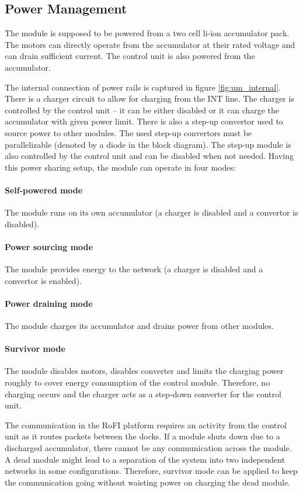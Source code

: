 \subsection{Power Management}

The module is supposed to be powered from a two cell li-ion accumulator pack.
The motors can directly operate from the accumulator at their rated voltage and
can drain sufficient current. The control unit is also powered from the
accumulator.

The internal connection of power rails is captured in figure
\ref{fig:um_internal}. There is a charger circuit to allow for charging from the
INT line. The charger is controlled by the control unit -- it can be either
disabled or it can charge the accumulator with given power limit. There is also
a step-up convertor used to source power to other modules. The used step-up
convertors must be parallelizable (denoted by a diode in the block diagram). The
step-up module is also controlled by the control unit and can be disabled when
not needed. Having this power sharing setup, the module can operate in four
modes:

\paragraph{Self-powered mode} The module runs on its own accumulator (a charger
is disabled and a convertor is disabled).

\paragraph{Power sourcing mode} The module provides energy to the network
(a charger is disabled and a convertor is enabled).

\paragraph{Power draining mode} The module charges its accumulator and drains
power from other modules.

\paragraph{Survivor mode} The module disables motors, disables converter and
limits the charging power roughly to cover energy consumption of the control
module. Therefore, no charging occurs and the charger acts as a step-down
converter for the control unit.

The communication in the RoFI platform requires an activity from the control
unit as it routes packets between the docks. If a module shuts down due to a
discharged accumulator, there cannot be any communication across the module.
A dead module might lead to a separation of the system into two independent
networks in some configurations. Therefore, survivor mode can be applied to keep
the communication going without waisting power on charging the dead module.

